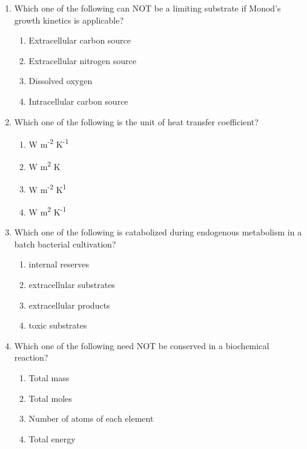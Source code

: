 \documentclass[12pt]{article}
\begin{document}
\begin{enumerate}[label=Q.\arabic*]
	\item Which one of the following can NOT be a limiting substrate if Monod’s growth kinetics is applicable?

		\begin{multicols}{2}
			\begin{enumerate}[label=(\Alph*)]
				\item Extracellular carbon source 
				\item Extracellular nitrogen source 
				\item Dissolved oxygen 
				\item Intracellular carbon source
			\end{enumerate}
		\end{multicols}

	\item Which one of the following is the unit of heat transfer coefficient?

		\begin{multicols}{2}
			\begin{enumerate}[label=(\Alph*)]
				\item W m\textsuperscript{-2} K\textsuperscript{-1} 
				\item W m\textsuperscript{2} K 
				\item W m\textsuperscript{-2} K\textsuperscript{1} 
				\item W m\textsuperscript{2} K\textsuperscript{-1}
			\end{enumerate}
		\end{multicols}
	\item Which one of the following is catabolized during endogenous metabolism in a batch bacterial cultivation?

		\begin{multicols}{2}
			\begin{enumerate}[label=(\Alph*)]
				\item internal reserves 
				\item extracellular substrates 
				\item extracellular products 
				\item toxic substrates
			\end{enumerate}
		\end{multicols}

	\item Which one of the following need NOT be conserved in a biochemical reaction?

		\begin{multicols}{2}
			\begin{enumerate}[label=(\Alph*)]
				\item Total mass 
				\item Total moles 
				\item Number of atoms of each element 
				\item Total energy
			\end{enumerate}
		\end{multicols}


\end{enumerate}
\end{document}

